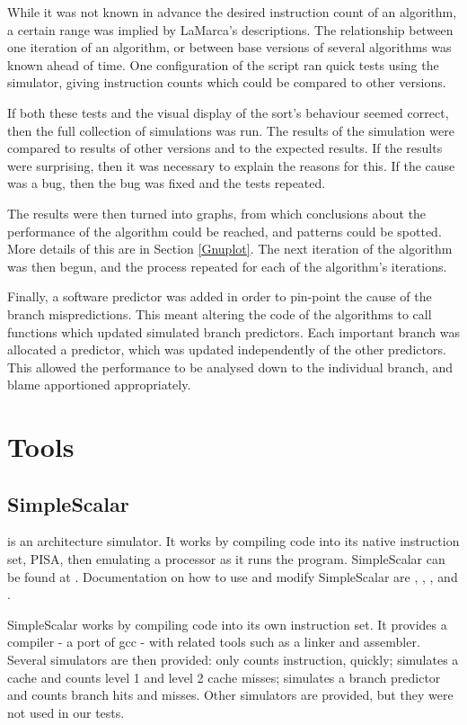 While it was not known in advance the desired instruction count of an algorithm,
a certain range was implied by LaMarca's descriptions. The relationship between
one iteration of an algorithm, or between base versions of several algorithms
was known ahead of time. One configuration of the  script ran quick
tests using the  simulator, giving instruction counts which could
be compared to other versions. 

If both these tests and the visual display of the sort's behaviour seemed
correct, then the full collection of simulations was run. The results of the
simulation were compared to results of other versions and to the expected
results. If the results were surprising, then it was necessary to explain the
reasons for this. If the cause was a bug, then the bug was fixed and the tests
repeated.

The results were then turned into graphs, from which conclusions about the
performance of the algorithm could be reached, and patterns could be spotted.
More details of this are in Section \ref{Gnuplot}. The next iteration of the
algorithm was then begun, and the process repeated for each of the algorithm's
iterations.

Finally, a software predictor was added in order to pin-point the cause of the
branch mispredictions. This meant altering the code of the algorithms to call
functions which updated simulated branch predictors. Each important branch was
allocated a predictor, which was updated independently of the other predictors.
This allowed the performance to be analysed down to the individual branch, and
blame apportioned appropriately.

\section{Tools}

\subsection{SimpleScalar}  is an architecture simulator. It
works by compiling code into its native instruction set, PISA, then emulating a
processor as it runs the program.  SimpleScalar can be found at
. Documentation on how to use and modify
SimpleScalar are \cite{Burger97}, \cite{Austin02}, \cite{Tutorialv4},
\cite{Tutorialv2} and \cite{SimpleScalarUserGuide}.

SimpleScalar works by compiling code into its own instruction set. It provides a
compiler - a port of gcc - with related tools such as a linker and assembler.
Several simulators are then provided:  only counts instruction,
quickly;  simulates a cache and counts level 1 and level 2 cache
misses;  simulates a branch predictor and counts branch hits and
misses. Other simulators are provided, but they were not used in our tests.

